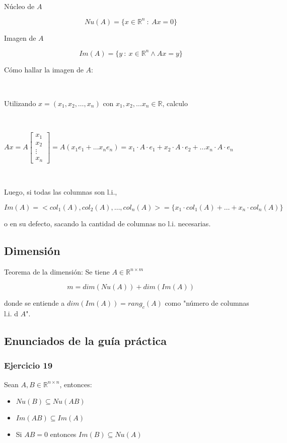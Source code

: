 \

Núcleo de $A$

\[Nu(A) = \{x \in \mathbb{R}^{n} ~:~ Ax = 0\}\]


Imagen de $A$

\[Im(A) = \{y ~:~ x \in \mathbb{R}^{n} \land Ax = y\}\]

Cómo hallar la imagen de $A$:

\

Utilizando $x = (x_1, x_2, \ldots, x_n)$ con $x_1,x_2,\ldots x_n \in \mathbb{R}$, calculo 

\

$Ax = A\begin{bmatrix}
x_1 \\
x_2 \\
\vdots \\
x_n
\end{bmatrix} = A(x_1 e_1 + \ldots x_n e_n) =
x_1\cdot A\cdot e_1 + x_2\cdot A\cdot e_2 + \ldots x_n\cdot A\cdot e_n$

\

Luego, si todas las columnas son l.i., 

\[Im(A) = <col_1(A), col_2(A),\ldots, col_n(A)> = \{x_1\cdot col_1(A) + \ldots + x_n \cdot col_n(A)\}\]

o en su defecto, sacando la cantidad de columnas no l.i. necesarias.

\subsection{Dimensión}
\label{subsec:dimension_matriz}

Teorema de la dimensión: Se tiene $A \in \mathbb{R}^{n \times m}$

\[m = dim(Nu(A)) + dim(Im(A))\]

donde se entiende a $dim(Im(A)) = rang_c(A)$ como "número de columnas l.i. d $A$".

\newpage

\subsection{Enunciados de la guía práctica}
\label{subsec:enunciados_guia_1}

\subsubsection{Ejercicio 19}
\label{subsubsec:guia_1_ej_19}

Sean $A,B \in \mathbb{R}^{n \times n}$, entonces:
\begin{itemize}
    \item $Nu(B) \subseteq Nu(AB)$
    \item $Im(AB) \subseteq Im(A)$
    \item Si $AB = 0$ entonces $Im(B) \subseteq Nu(A)$
\end{itemize}

